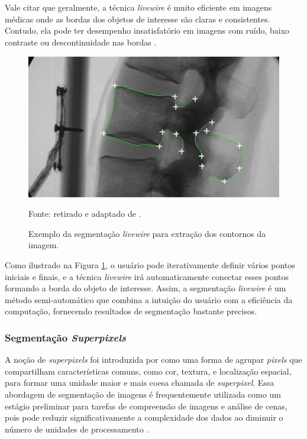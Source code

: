 Vale citar que geralmente, a técnica \textit{livewire} é muito eficiente em imagens médicas onde as bordas dos objetos de interesse são claras e consistentes. Contudo, ela pode ter desempenho insatisfatório em imagens com ruído, baixo contraste ou descontinuidade nas bordas \citep{Falcao1997Paradigmas3D-Live-Wire}.

\begin{figure}[H]
    \centering
    \caption[Segmentação \textit{livewire}.]{Exemplo da segmentação \textit{livewire} para extração dos contornos da imagem.}
    \label{segment:fig:livewire}
    \includegraphics[width=0.8\linewidth]{recursos/imagens/image_seg/livewire.png}
    
    Fonte: retirado e adaptado de \cite{Zheng2011ScaledFluoroscopy}.
\end{figure}


Como ilustrado na Figura \ref{segment:fig:livewire}, o usuário pode iterativamente definir vários pontos iniciais e finais, e a técnica \textit{livewire} irá automaticamente conectar esses pontos formando a borda do objeto de interesse. Assim, a segmentação \textit{livewire} é um método semi-automático que combina a intuição do usuário com a eficiência da computação, fornecendo resultados de segmentação bastante precisos.

\subsubsection{Segmentação \textit{Superpixels}}
\label{segment:superpixel}
A noção de \textit{superpixels} foi introduzida por \cite{Ren2003LearningSegmentation} como uma forma de agrupar \textit{pixels} que compartilham características comuns, como cor, textura, e localização espacial, para formar uma unidade maior e mais coesa chamada de \textit{superpixel}. Essa abordagem de segmentação de imagens é frequentemente utilizada como um estágio preliminar para tarefas de compreensão de imagens e análise de cenas, pois pode reduzir significativamente a complexidade dos dados ao diminuir o número de unidades de processamento \citep{Achanta2012SLICMethods}.

